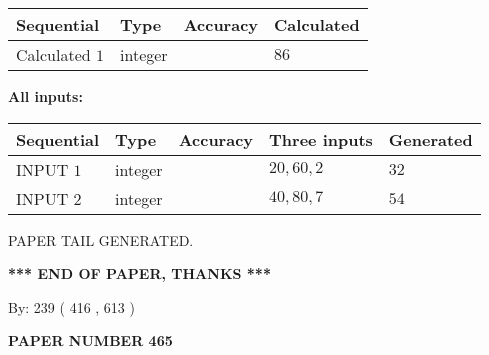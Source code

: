 \documentclass[12pt]{article}
\begin{document}
   
  
  
\noindent\begin{tabular}{|l|l|l|l|}
\hline
 Sequential & Type & Accuracy & Calculated \\ 
\hline
 
 
  Calculated $  1 $ & integer &  & 
  $ 86 $ 
 \\  \hline  
 \end{tabular}
   
   
   
   
\noindent\vspace{0.1in}\hspace{-0.08in} {\textbf{\Large{All inputs: }}}
   
   
  
  
\noindent\begin{tabular}{|l|l|l|l|l|}
\hline
 Sequential & Type & Accuracy & Three inputs & Generated \\ 
\hline
 
 
  INPUT $  1 $ & integer &  & $
 20
 , 
 60
 , 
 2
 $ & $ 32 $ 
 \\  \hline  
 
 
  INPUT $  2 $ & integer &  & $
 40
 , 
 80
 , 
 7
 $ & $ 54 $ 
 \\  \hline  
 \end{tabular}
   
   
   
   
   
   
 \vspace{0.2in}
 
   
   
\vspace{2.0in} PAPER TAIL GENERATED.
   
   
   
   
\vspace{1.0in} 
{\textbf{\large{ *** END OF PAPER, THANKS *** }}} 
   
   
\hspace{1.0in} By: 
 239 ( 416 ,  613 )
   
   
   
   
\newpage 
\setcounter{page}{ 
   465001 } 
   
   
   
   
 {\textbf{ \Large{ PAPER NUMBER  465  }}}
   
   
\vspace{0.2in}
   
   
   
\end{document}
